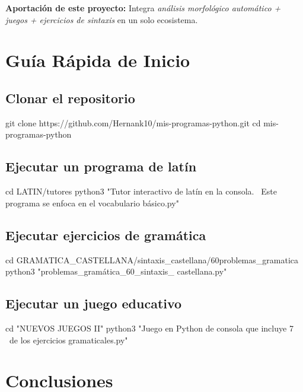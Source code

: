 \documentclass[12pt,spanish]{article}
\begin{document}
\textbf{Aportación de este proyecto:} Integra \textit{análisis morfológico automático + juegos + ejercicios de sintaxis} en un solo ecosistema.

\section{Guía Rápida de Inicio}

\subsection{Clonar el repositorio}

\begin{codigo}
git clone https://github.com/Hernank10/mis-programas-python.git
cd mis-programas-python
\end{codigo}

\subsection{Ejecutar un programa de latín}

\begin{codigo}
cd LATIN/tutores
python3 "Tutor interactivo de latín en la consola. \
Este programa se enfoca en el vocabulario básico.py"
\end{codigo}

\subsection{Ejecutar ejercicios de gramática}

\begin{codigo}
cd GRAMATICA_CASTELLANA/sintaxis_castellana/60problemas_gramatica
python3 "problemas_gramática_60_sintaxis_ castellana.py"
\end{codigo}

\subsection{Ejecutar un juego educativo}

\begin{codigo}
cd "NUEVOS JUEGOS II"
python3 "Juego en Python de consola que incluye 7 \
de los ejercicios gramaticales.py"
\end{codigo}

\section{Conclusiones}
\end{document}
